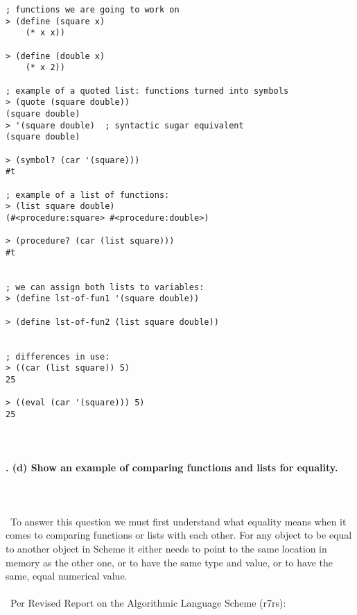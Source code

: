 \documentclass{article}
\begin{document}
\begin{verbatim} 
; functions we are going to work on
> (define (square x)
    (* x x))

> (define (double x)
    (* x 2))

; example of a quoted list: functions turned into symbols
> (quote (square double))
(square double)
> '(square double)	; syntactic sugar equivalent
(square double)

> (symbol? (car '(square)))
#t

; example of a list of functions:
> (list square double)
(#<procedure:square> #<procedure:double>)

> (procedure? (car (list square)))
#t


; we can assign both lists to variables: 
> (define lst-of-fun1 '(square double))

> (define lst-of-fun2 (list square double))


; differences in use:
> ((car (list square)) 5)
25

> ((eval (car '(square))) 5)
25
\end{verbatim}

\paragraph{}\
\paragraph{. (d) Show an example of comparing functions and lists for equality.}\
\paragraph{}\
To answer this question we must first understand what equality means when it comes to comparing functions or lists with each other. For any object to be equal to another object in Scheme it either needs to point to the same location in memory as the other one, or to have the same type and value, or to have the same, equal numerical value. 

\paragraph{}\
Per Revised Report on the Algorithmic Language Scheme (r7rs):
\end{document}
